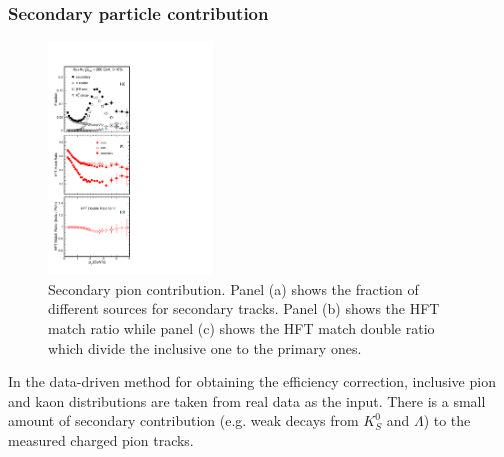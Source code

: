 \documentclass[%
 reprint,	
 amsmath,amssymb,
 aps,
 prc,
]{revtex4-1}
\begin{document}
\subsubsection{\label{sec:correction:hft:secondary}Secondary particle contribution}

\begin{figure}[h]
\centering
\includegraphics[width=0.39\textwidth, angle = 0]{fig/Fraction_Pion.pdf}
\caption{Secondary pion contribution. Panel (a) shows the fraction of different sources for secondary tracks. Panel (b) shows the HFT match ratio while panel (c) shows the HFT match double ratio which divide the inclusive one to the primary ones.}
\label{fig:Fraction_Pion} 
\end{figure}

In the data-driven method for obtaining the efficiency correction, inclusive pion and kaon distributions are taken from real data as the input. There is a small amount of secondary contribution (e.g. weak decays from $K^0_S$ and $\Lambda$) to the measured charged pion tracks.
\end{document}
